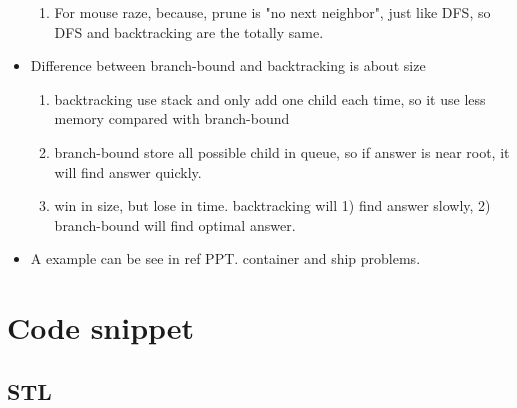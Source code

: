\documentclass[a4paper,12pt,twoside]{book}
\begin{document}
\begin{itemize}
\begin{enumerate}
\item For mouse raze, because, prune is "no next neighbor", just like DFS, so DFS and backtracking are the totally same.
\end{enumerate}

\item Difference between branch-bound  and backtracking is about size
\begin{enumerate}
\item backtracking use stack and only add one child each time, so it use less memory compared with branch-bound
\item branch-bound store all possible child in queue, so if answer is near root, it will find answer quickly. 

\item win in size, but lose in time. backtracking will 1) find answer slowly, 2) branch-bound will find optimal answer. 
\end{enumerate}

\item A example can be see in ref PPT.  container and ship problems. 

\end{itemize}


\chapter{Code snippet}
\section{STL}
\end{document}
